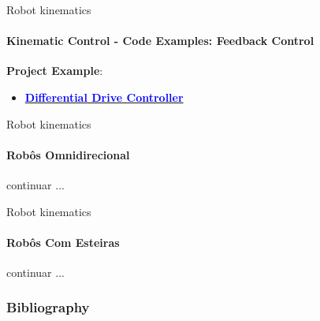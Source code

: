 \documentclass[aspectratio=169]{beamer}
\begin{document}
\begin{frame}[fragile]{Robot kinematics}
    \framesubtitle{Kinematic Control - Code Examples: Feedback Control}

    \textbf{Project Example}:
    \begin{itemize}
        \item \href{https://gitlab.com/jeferson.lima/diff_drive_controller}{\textcolor{blue}{\textbf{Differential Drive Controller}}}
    \end{itemize}   
\end{frame}


\begin{frame}{Robot kinematics}
    \framesubtitle{Robôs Omnidirecional}
    continuar ...
\end{frame}

\begin{frame}{Robot kinematics}
    \framesubtitle{Robôs Com Esteiras}
    continuar ...
\end{frame}

  
\begin{frame}[t, allowframebreaks]
	\frametitle{Bibliography}
	
\end{frame}
  
\end{document}
